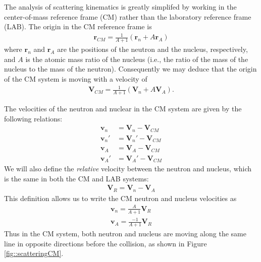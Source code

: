 \documentclass[11pt]{article}
\renewcommand\vec{\mathbf}
\begin{document}
The analysis of scattering kinematics is greatly simplifed by working in the center-of-mass reference frame (CM) rather than the laboratory reference frame (LAB).  The origin in the CM reference frame is 
\begin{align}
  \vec{r}_{CM} = \frac{1}{A+1} \left( \vec{r}_n + A\vec{r}_A \right)
\end{align}
where \(\vec{r}_n\) and \(\vec{r}_A\) are the positions of the neutron and the nucleus, respectively, and \(A\) is the atomic mass ratio of the nucleus (i.e., the ratio of the mass of the nucleus to the mass of the neutron).  Consequently we may deduce that the origin of the CM system is moving with a velocity of
\begin{align}
  \vec{V}_{CM} = \frac{1}{A+1} \left(\vec{V}_n + A\vec{V}_A \right).
\end{align}

The velocities of the neutron and nuclear in the CM system are given by the following relations:
\begin{subequations}
\begin{align}
  \vec{v}_n  &= \vec{V}_n - \vec{V}_{CM} \\
  \vec{v}_n' &= \vec{V}_n' - \vec{V}_{CM} \\ 
  \vec{v}_A  &= \vec{V}_A - \vec{V}_{CM} \\
  \vec{v}_A' &= \vec{V}_A' - \vec{V}_{CM}
\end{align}
\label{eq:cmDefs}
\end{subequations}
We will also define the \emph{relative} velocity between the neutron and nucleus, which is the same in both the CM and LAB systems:
\begin{align}
  \vec{V}_R = \vec{V}_n - \vec{V}_A
\end{align}
This definition allows us to write the CM neutron and nucleus velocities as
\begin{subequations}
\begin{align}
  \vec{v}_n = \frac{A}{A+1}\vec{V}_R \\
  \vec{v}_A = \frac{-1}{A+1}\vec{V}_R
\end{align}
\label{eq:cmVelRel}
\end{subequations}
Thus in the CM system, both neutron and nucleus are moving along the same line in opposite directions before the collision, as shown in Figure \ref{fig::scatteringCM}.
\end{document}
